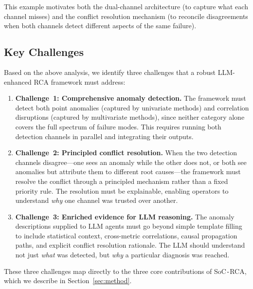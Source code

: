 \documentclass[a4paper,fleqn]{cas-dc}
\newcommand{\sysname}{SoC\texttt{-}RCA}
\begin{document}
This example motivates both the dual-channel architecture (to capture what each channel misses) and the conflict resolution mechanism (to reconcile disagreements when both channels detect different aspects of the same failure).

\subsection{Key Challenges}

Based on the above analysis, we identify three challenges that a robust LLM-enhanced RCA framework must address:

\begin{enumerate}[leftmargin=*]
  \item \textbf{Challenge~1: Comprehensive anomaly detection.}  The framework must detect both point anomalies (captured by univariate methods) and correlation disruptions (captured by multivariate methods), since neither category alone covers the full spectrum of failure modes.  This requires running both detection channels in parallel and integrating their outputs.

  \item \textbf{Challenge~2: Principled conflict resolution.}  When the two detection channels disagree---one sees an anomaly while the other does not, or both see anomalies but attribute them to different root causes---the framework must resolve the conflict through a principled mechanism rather than a fixed priority rule.  The resolution must be explainable, enabling operators to understand \emph{why} one channel was trusted over another.

  \item \textbf{Challenge~3: Enriched evidence for LLM reasoning.}  The anomaly descriptions supplied to LLM agents must go beyond simple template filling to include statistical context, cross-metric correlations, causal propagation paths, and explicit conflict resolution rationale.  The LLM should understand not just \emph{what} was detected, but \emph{why} a particular diagnosis was reached.
\end{enumerate}

These three challenges map directly to the three core contributions of \sysname{}, which we describe in Section~\ref{sec:method}.



\end{document}
